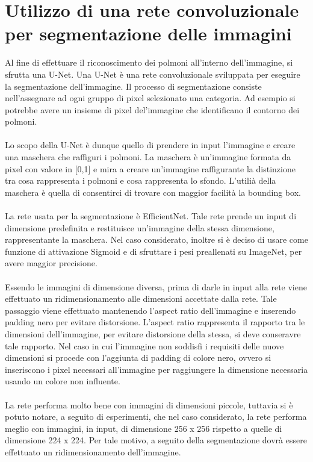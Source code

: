 \section{Utilizzo di una rete convoluzionale per segmentazione delle immagini}
Al fine di effettuare il riconoscimento dei polmoni all'interno dell'immagine, si sfrutta una U-Net.
Una U-Net è una rete convoluzionale sviluppata per eseguire la segmentazione dell'immagine. Il processo di segmentazione consiste nell'assegnare ad 
ogni gruppo di pixel selezionato una categoria. Ad esempio si potrebbe avere un insieme di pixel del'immagine che identificano il contorno dei polmoni.
\\\\
Lo scopo della U-Net è dunque quello di prendere in input l'immagine e creare una maschera che raffiguri i polmoni.
La maschera è un'immagine formata da pixel con valore in [0,1] e mira a creare un'immagine raffigurante la distinzione tra cosa rappresenta 
i polmoni e cosa rappresenta lo sfondo.
L'utilià della maschera è quella di consentirci di trovare con maggior facilità la bounding box.
\\\\
La rete usata per la segmentazione è EfficientNet. Tale rete prende un input di dimensione predefinita e restituisce un'immagine della stessa
dimensione, rappresentante la maschera. Nel caso considerato, inoltre si è deciso di usare come funzione di attivazione Sigmoid e di sfruttare 
i pesi preallenati su ImageNet, per avere maggior precisione.
\\\\
Essendo le immagini di dimensione diversa, prima di darle in input alla rete viene effettuato un ridimensionamento alle dimensioni accettate dalla rete. 
Tale passaggio viene effettuato mantenendo l'aspect ratio dell'immagine e inserendo padding nero per evitare distorsione.
L'aspect ratio rappresenta il rapporto tra le dimensioni dell'immagine, per evitare distorsione della stessa, si deve conseravre tale rapporto.
Nel caso in cui l'immagine non soddisfi i requisiti delle nuove dimensioni si procede con l'aggiunta di padding di colore nero, ovvero si inseriscono i pixel necessari 
all'immagine per raggiungere la dimensione necessaria usando un colore non influente. 
\\\\
La rete performa molto bene con immagini di dimensioni piccole, tuttavia si è potuto notare, a seguito di esperimenti, che nel caso considerato, la rete 
performa meglio con immagini, in input, di dimensione 256 x 256 rispetto a quelle di dimensione 224 x 224.
Per tale motivo, a seguito della segmentazione dovrà essere effettuato un ridimensionamento dell'immagine.

